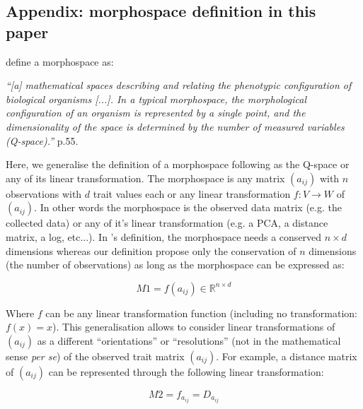 \documentclass[12pt,letterpaper]{article}
\begin{document}
\subsection{Appendix: morphospace definition in this paper} \label{section:appendixmorphospace}

\noindent \cite{mitteroecker2009concept} define a morphospace as:

\setlength{\leftskip}{1cm}
\setlength{\rightskip}{1cm}

\noindent \textit{``[a] mathematical spaces describing and relating the phenotypic configuration of biological organisms [...]. In a typical morphospace, the morphological configuration of an organism is represented by a single point, and the dimensionality of the space is determined by the number of measured variables (Q-space).''} \citealt{mitteroecker2009concept} p.55.

\setlength{\leftskip}{0pt}
\setlength{\rightskip}{0pt}

\noindent Here, we generalise the definition of a morphospace following \cite{mitteroecker2009concept} as the Q-space or any of its linear transformation.
The morphospace is any matrix $(a_{ij})$ with $n$ observations with $d$ trait values each or any linear transformation $f: V \to W$ of $(a_{ij})$.
In other words the morphospace is the observed data matrix (e.g. the collected data) or any of it's linear transformation (e.g. a PCA, a distance matrix, a log, etc...).
In \cite{mitteroecker2009concept}'s definition, the morphospace needs a conserved $n \times d$ dimensions whereas our definition propose only the conservation of $n$ dimensions (the number of observations) as long as the morphospace can be expressed as:

\begin{equation}
    M1 = f(a_{ij})\in \mathbb{R}^{{n}\times{d}}
\end{equation}

\noindent Where $f$ can be any linear transformation function (including no transformation: $f(x) = x$).
This generalisation allows to consider linear transformations of $(a_{ij})$ as a different ``orientations'' or ``resolutions'' (not in the mathematical sense \textit{per se}) of the observed trait matrix $(a_{ij})$. For example, a distance matrix of $(a_{ij})$ can be represented through the following linear transformation:

\begin{equation}
    M2 = f_{a_{ij}} = D_{a_{ij}}
\end{equation}
\end{document}
